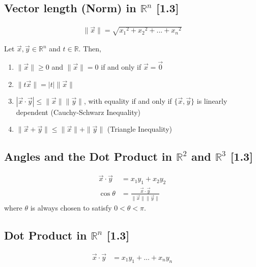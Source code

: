 \documentclass[a4paper,9pt]{extarticle}
\begin{document}
\begin{multicols*}{2}

\subsection{Vector length (Norm) in $\mathbb{R}^n$ [1.3]}
\begin{equation} \label{1.3-1}
    \begin{split}
        \|\vec{x}\| = \sqrt{{x_1}^2 + {x_2}^2 + ... + {x_n}^2}
    \end{split}
\end{equation}

Let $\vec{x}, \vec{y} \in \mathbb{R}^n$ and $t \in \mathbb{R}$. Then,
\begin{enumerate}[label=\bfseries (\arabic*)] \itemsep0pt \parskip0pt 
    \item $\|\vec{x}\| \geq 0$ and $\|\vec{x}\| = 0$ if and only if $\vec{x} = \vec{0}$
    \item $\|t \vec{x}\| = |t| \|\vec{x}\|$
    \item $|\vec{x} \cdot \vec{y}| \leq \|\vec{x}\| \|\vec{y}\|$, with equality if and only if $\{\vec{x}, \vec{y}\}$ is linearly dependent (Cauchy-Schwarz Inequality)
    \item $\|\vec{x} + \vec{y}\| \leq \|\vec{x}\| + \|\vec{y}\|$ (Triangle Inequality)
\end{enumerate}


\subsection{Angles and the Dot Product in $\mathbb{R}^2$ and $\mathbb{R}^3$ [1.3]}
\begin{equation} \label{1.3-2}
    \begin{split}
        \vec{x} \cdot \vec{y} & = x_1 y_1 + x_2 y_2 \\
        \cos{\theta} & = \frac{\vec{x} \cdot \vec{y}}{\|\vec{x}\| \|\vec{y}\|} 
    \end{split}
\end{equation}
where $\theta$ is always chosen to satisfy $0 < \theta < \pi$.


\subsection{Dot Product in $\mathbb{R}^n$ [1.3]}
\begin{equation} \label{1.3-3}
    \begin{split}
        \vec{x} \cdot \vec{y} & = x_1 y_1 + ... + x_n y_n
    \end{split}
\end{equation}


\end{multicols*}
\end{document}
